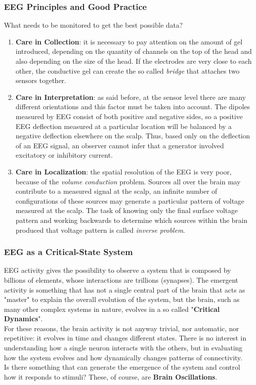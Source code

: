 \subsubsection{EEG Principles and Good Practice}
What needs to be monitored to get the best possible data?
\begin{enumerate}
    \item \textbf{Care in Collection}: it is necessary to pay attention on the amount of gel introduced, depending on the quantity 
    of channels on the top of the head and also depending on the size of the head. If the electrodes are very close to each other, 
    the conductive gel can create the so called \textit{bridge} that attaches two sensors together.
    \item \textbf{Care in Interpretation}: as said before, at the sensor level there are many different orientations and this factor 
    must be taken into account. The dipoles measured by EEG consist of both positive and negative sides, so a positive EEG 
    deflection measured at a particular location will be balanced by a negative deflection elsewhere on the scalp. Thus, based only on the 
    deflection of an EEG signal, an observer cannot infer that a generator involved excitatory or inhibitory current.
    \item \textbf{Care in Localization}: the spatial resolution of the EEG is very poor, because of the \textit{volume conduction} problem. 
    Sources all over the brain may contribute to a measured signal at the scalp, an infinite number of configurations of these sources may 
    generate a particular pattern of voltage measured at the scalp. The task of knowing only the final surface voltage pattern and working 
    backwards to determine which sources within the brain produced that voltage pattern is called \textit{inverse problem}.
\end{enumerate}

\subsubsection{EEG as a Critical-State System}
EEG activity gives the possibility to observe a system that is composed by billions of elements, whose interactions are trillions (synapses). 
The emergent activity is something that has not a single central part of the brain that acts as "master" to explain the 
overall evolution of the system, but the brain, such as many other complex systems in nature, evolves in a so called "\textbf{Critical Dynamics}".\\
For these reasons, the brain activity is not anyway trivial, nor automatic, nor repetitive: it evolves in time and changes different states.
There is no interest in understanding how a single neuron interacts with the others, but in evaluating how the system evolves and how dynamically 
changes patterns of connectivity.\\
Is there something that can generate the emergence of the system and control how it responds to stimuli? These, of course, are \textbf{Brain 
Oscillations}.

